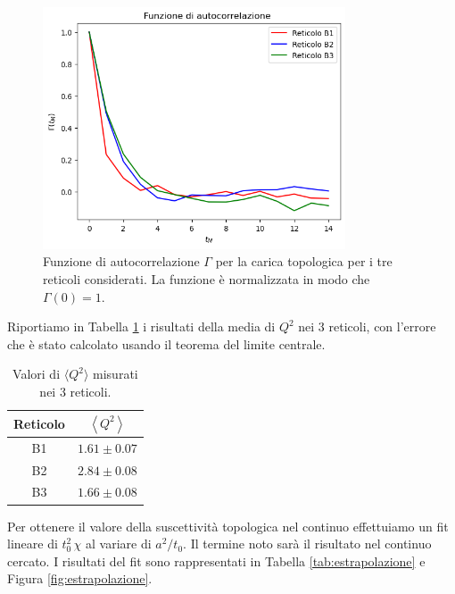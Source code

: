 \documentclass{article}
\numberwithin{equation}{subsection}
\begin{document}
\begin{figure}[h]
    \centering
    \includegraphics[width=0.8\textwidth]{images/gamma.png}
    \caption{Funzione di autocorrelazione $\Gamma$ per la carica topologica per i tre reticoli considerati. La funzione è normalizzata in modo che $\Gamma(0)=1$. }
    \label{Gamma}
\end{figure}

Riportiamo in Tabella \ref{susc} i risultati della media di $Q^2$ nei 3 reticoli, con l'errore che è stato calcolato usando il teorema del limite centrale. 

\begin{table}[h]
    \centering
    \begin{tabular}{||c c||} 
     \hline
     Reticolo & $\left< Q^2\right>$ \\[0.5ex] 
     \hline\hline
     B1 & $ 1.61 \pm 0.07$  \\
     B2 & $2.84 \pm 0.08$  \\
     B3 & $1.66 \pm 0.08$  \\[1ex] 
     \hline
    \end{tabular}
    \caption{Valori di $\langle Q^2 \rangle$ misurati nei 3 reticoli.}
    \label{susc}
\end{table}

Per ottenere il valore della suscettività topologica nel continuo effettuiamo un fit lineare di $t_0^2\,\chi$ al variare di $a^2/t_0$. Il termine noto sarà il risultato nel continuo cercato. I risultati del fit sono rappresentati in Tabella \ref{tab:estrapolazione} e Figura \ref{fig:estrapolazione}.
\end{document}
